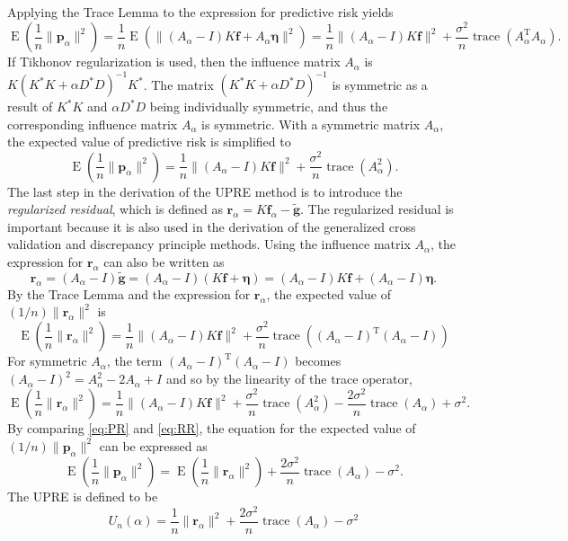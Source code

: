 \documentclass[12pt,notitlepage]{report}
\newcommand{\gnoiseVec}{\widetilde{\mathbf{g}}}	%
\newcommand{\kMat}{K}	%
\newcommand{\fVec}{\mathbf{f}}	%
\newcommand{\trans}{\mathrm{T}}	%
\newcommand{\ctrans}{*}	%
\DeclareMathOperator{\trace}{trace}		%
\newcommand{\regparam}{\alpha}
\newcommand{\regf}{\fVec_{\regparam}}	%
\newcommand{\noise}{\eta}	%
\newcommand{\noiseSD}{\sigma}	%
\newcommand{\noiseVec}{\bm{\noise}}	%
\DeclareMathOperator{\E}{E}	%
\newcommand{\PE}{\mathbf{p}_{\regparam}}	%
\newcommand{\regres}{\mathbf{r}_{\regparam}}	%
\newcommand{\A}{A_{\regparam}}	%
\newcommand{\U}{U}	%
\begin{document}
\noindent Applying the Trace Lemma to the expression for predictive risk yields
\[\E\left(\frac{1}{n}\|\PE\|^2\right) = \frac{1}{n}\E\left(\|(\A-I)\kMat\fVec + \A\noiseVec\|^2\right) = \frac{1}{n}\|(\A-I)\kMat\fVec\|^2 + \frac{\noiseSD^2}{n}\trace({\A^\trans}\A).\]
If Tikhonov regularization is used, then the influence matrix $\A$ is $\kMat(\kMat^\ctrans\kMat + \regparam{D^\ctrans}D)^{-1}\kMat^\ctrans$. The matrix $(\kMat^\ctrans\kMat + \regparam{D^\ctrans}D)^{-1}$ is symmetric as a result of $\kMat^\ctrans\kMat$ and $\regparam{D^\ctrans}D$ being individually symmetric, and thus the corresponding influence matrix $\A$ is symmetric.  With a symmetric matrix $\A$, the expected value of predictive risk is simplified to
\begin{equation}
\label{eq:PR}
\E\left(\frac{1}{n}\|\PE\|^2\right) = \frac{1}{n}\|(\A-I)\kMat\fVec\|^2 + \frac{\noiseSD^2}{n}\trace(\A^2).
\end{equation}
\indent The last step in the derivation of the UPRE method is to introduce the \textit{regularized residual}, which is defined as $\regres = \kMat\regf - \gnoiseVec$. The regularized residual is important because it is also used in the derivation of the generalized cross validation and discrepancy principle methods. Using the influence matrix $\A$, the expression for $\regres$ can also be written as
\[\regres = (\A-I)\gnoiseVec = (\A-I)(\kMat\fVec + \noiseVec) = (\A-I)\kMat\fVec + (\A-I)\noiseVec.\]
By the Trace Lemma and the expression for $\regres$, the expected value of $(1/n)\|\regres\|^2$ is
\[\E\left(\frac{1}{n}\|\regres\|^2\right) = \frac{1}{n}\|(\A-I)\kMat\fVec\|^2 + \frac{\noiseSD^2}{n}\trace({(\A-I)^\trans}(\A-I))\]
For symmetric $\A$, the term $(\A-I)^\trans(\A-I)$ becomes $(\A-I)^2 = \A^2 - 2\A + I$ and so by the linearity of the trace operator,
\begin{equation}
\label{eq:RR}
\E\left(\frac{1}{n}\|\regres\|^2\right) = \frac{1}{n}\|(\A-I)\kMat\fVec\|^2 + \frac{\noiseSD^2}{n}\trace(\A^2) - \frac{2\noiseSD^2}{n}\trace(\A) + \noiseSD^2.
\end{equation}
By comparing \eqref{eq:PR} and \eqref{eq:RR}, the equation for the expected value of $(1/n)\|\PE\|^2$ can be expressed as
\[\E\left(\frac{1}{n}\|\PE\|^2\right) = \E\left(\frac{1}{n}\|\regres\|^2\right) + \frac{2\noiseSD^2}{n}\trace(\A) - \noiseSD^2.\]
The UPRE is defined to be
\begin{equation}
\label{eq:UPRE}
\U_n(\regparam) = \frac{1}{n}\|\regres\|^2 + \frac{2\noiseSD^2}{n}\trace(\A) - \noiseSD^2
\end{equation}
\end{document}
